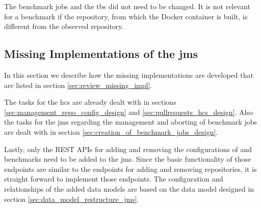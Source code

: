 The benchmark jobs and the \acl{tbs} did not need to be changed.
It is not relevant for a benchmark if the repository, from which the Docker container is built, is different from the observed repository.


\subsection{Missing Implementations of the \acl{jms}}
In this section we describe how the missing implementations are developed that are listed in section \ref{sec:review_missing_impl}.

The tasks for the \ac{hcs} are already dealt with in sections \ref{sec:management_repo_config_design} and \ref{sec:pullrequests_hcs_design}.
Also the tasks for the \ac{jms} regarding the management and aborting of benchmark jobs are dealt with in section \ref{sec:creation_of_benchmark_jobs_design}.

Lastly, only the REST APIs for adding and removing the configurations of \tsp{} and benchmarks need to be added to the \ac{jms}.
Since the basic functionality of those endpoints are similar to the endpoints for adding and removing repositories, it is straight forward to implement those endpoints.
The configuration and relationships of the added data models are based on the data model designed in section \ref{sec:data_model_restructure_jms}.



